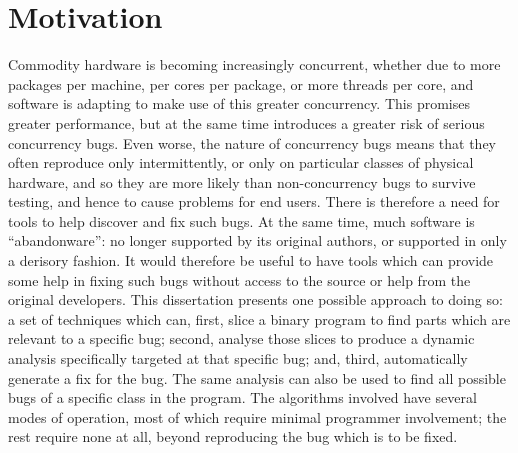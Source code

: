 



\section{Motivation}

Commodity hardware is becoming increasingly concurrent, whether due to
more packages per machine, per cores per package, or more threads per
core, and software is adapting to make use of this greater
concurrency.  This promises greater performance, but at the same time
introduces a greater risk of serious concurrency bugs.  Even worse,
the nature of concurrency bugs means that they often reproduce only
intermittently, or only on particular classes of physical hardware,
and so they are more likely than non-concurrency bugs to survive
testing, and hence to cause problems for end users.  There is
therefore a need for tools to help discover and fix such bugs.  At the
same time, much software is ``abandonware'': no longer supported by
its original authors, or supported in only a derisory fashion.  It
would therefore be useful to have tools which can provide some help in
fixing such bugs without access to the source or help from the
original developers.  This dissertation presents one possible approach
to doing so: a set of techniques which can, first, slice a binary
program to find parts which are relevant to a specific bug; second,
analyse those slices to produce a dynamic analysis specifically
targeted at that specific bug; and, third, automatically generate a
fix for the bug.   The same analysis can also be used
to find all possible bugs of a specific class in the program.  The
algorithms involved have several modes of operation, most of which
require minimal programmer involvement; the rest require none at all,
beyond reproducing the bug which is to be fixed.

